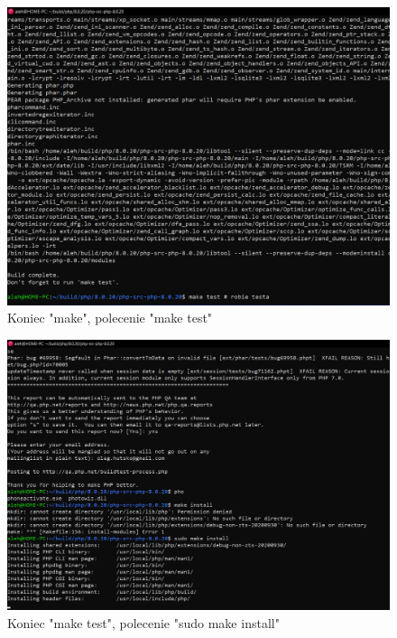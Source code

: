 \documentclass[a4paper,12pt,oneside]{report} %
\begin{document}
\begin{figure}[h]
    \includegraphics[width=16cm]{e10.png}
	\caption{Koniec "make", polecenie "make test"}
    \label{fig:fifth}
\end{figure}

\begin{figure}[h]
    \includegraphics[width=16cm]{e11.png}
	\caption{Koniec "make test", polecenie "sudo make install"}
    \label{fig:sixth}
\end{figure}
\end{document}
